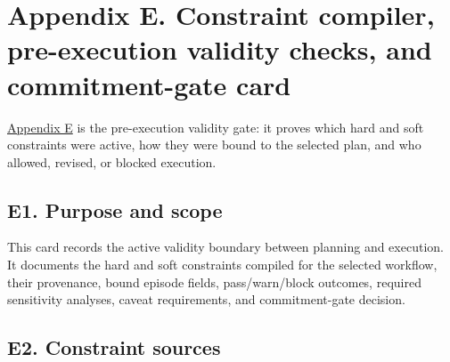 \section{\texorpdfstring{\textbf{Appendix E. Constraint compiler, pre-execution validity checks, and commitment-gate card}}{Appendix E. Constraint compiler, pre-execution validity checks, and commitment-gate card}}\label{appendix-e.-constraint-compiler-pre-execution-validity-checks-and-commitment-gate-card}\label{app:e}

\hyperref[app:e]{Appendix E} is the pre-execution validity gate: it proves which hard and soft constraints were active, how they were bound to the selected plan, and who allowed, revised, or blocked execution.

\subsection{\texorpdfstring{\textbf{E1. Purpose and scope}}{E1. Purpose and scope}}\label{e1.-purpose-and-scope}

This card records the active validity boundary between planning and execution. It documents the hard and soft constraints compiled for the selected workflow, their provenance, bound episode fields, pass/\allowbreak{}warn/\allowbreak{}block outcomes, required sensitivity analyses, caveat requirements, and commitment-gate decision.

\subsection{\texorpdfstring{\textbf{E2. Constraint sources}}{E2. Constraint sources}}\label{e2.-constraint-sources}

